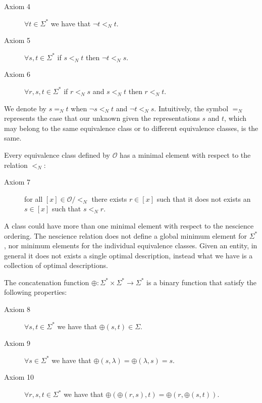 \vskip 0.25cm

\begin{description}
\item[Axiom 4] $\forall t \in \Sigma^\ast$ we have that $\lnot t <_N t$.
\item[Axiom 5] $\forall s , t \in \Sigma^\ast$ if $s <_N t$ then $\lnot t <_N s$.
\item[Axiom 6] $\forall r , s, t \in \Sigma^\ast$ if $r <_N s$ and $s <_N t$ then $r <_N t$.
\end{description}

\vskip 0.25cm

We denote by $ s =_N t$ when $\lnot s <_N t$ and $\lnot t <_N s$. Intuitively, the symbol $=_N$ represents the case that our unknown given the representations $s$ and $t$, which may belong to the same equivalence class or to different equivalence classes, is the same. 

Every equivalence class defined by $\mathcal{O}$ has a minimal element with respect to the relation $<_N$:

\vskip 0.25cm

\begin{description}
\item[Axiom 7] for all $[x] \in \mathcal{O} / <_N$ there exists $r \in [x]$ such that it does not exists an $s \in [x]$ such that $s <_N r$.
\end{description}

\vskip 0.25cm

A class could have more than one minimal element with respect to the nescience ordering. The nescience relation does not define a global minimum element for $\Sigma^\ast$, nor minimum elements for the individual equivalence classes. Given an entity, in general it does not exists a single optimal description, instead what we have is a collection of optimal descriptions.

The concatenation function $\oplus : \Sigma^\ast \times \Sigma^\ast \rightarrow \Sigma^\ast$ is a binary function that satisfy the following properties:

\vskip 0.25cm

\begin{description}
\item[Axiom 8] $\forall s, t \in \Sigma^\ast$ we have that $\oplus(s, t) \in \Sigma$.
\item[Axiom 9] $\forall s \in \Sigma^\ast$ we have that $\oplus(s, \lambda) = \oplus( \lambda, s) = s$.
\item[Axiom 10] $\forall r, s, t \in \Sigma^\ast$ we have that $\oplus(\oplus(r, s), t) = \oplus(r, \oplus(s, t))$.
\end{description}

